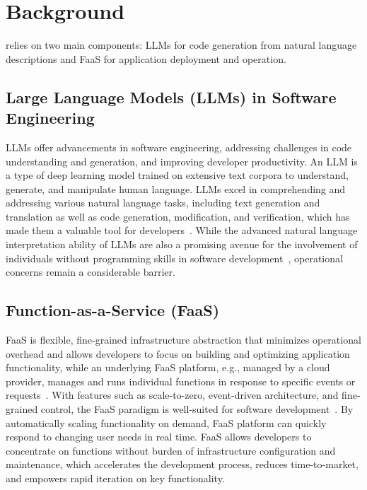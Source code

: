 \section{Background}
\label{sec:background}

\sysname{} relies on two main components: LLMs for code generation from natural language descriptions and FaaS for application deployment and operation.

\subsection{Large Language Models (LLMs) in Software Engineering}
\label{sec:background:llms}
LLMs offer advancements in software engineering, addressing challenges in code understanding and generation, and improving developer productivity.
An LLM is a type of deep learning model trained on extensive text corpora to understand, generate, and manipulate human language. 
LLMs excel in comprehending and addressing various natural language tasks, including text generation and translation as well as code generation, modification, and verification, which has made them a valuable tool for developers~\cite{liu2024your,vaithilingam2022expectation,ni2023lever,weisz2021perfection,xu2022ide,jin2024can}.
While the advanced natural language interpretation ability of LLMs are also a promising avenue for the involvement of individuals without programming skills in software development~\cite{bernsteiner2022citizen,smith2020unleashing,corradini2021floware}, operational concerns remain a considerable barrier.


\subsection{Function-as-a-Service (FaaS)}
\label{sec:background:faas}

FaaS is flexible, fine-grained infrastructure abstraction that minimizes operational overhead and allows developers to focus on building and optimizing application functionality, while an underlying FaaS platform, e.g., managed by a cloud provider, manages and runs individual functions in response to specific events or requests~\cite{baldini2017serverless, mcgrath2017serverless}.
With features such as scale-to-zero, event-driven architecture, and fine-grained control, the FaaS paradigm is well-suited for software development~\cite{gupta2023integration,macia2023serverless,kjorveziroski2021iot,gadepalli2019challenges,wen2021empirical,wolski2019cspot}. %
By automatically scaling functionality on demand, FaaS platform can quickly respond to changing user needs in real time.
FaaS allows developers to concentrate on functions without burden of infrastructure configuration and maintenance, which accelerates the development process, reduces time-to-market, and empowers rapid iteration on key functionality.
